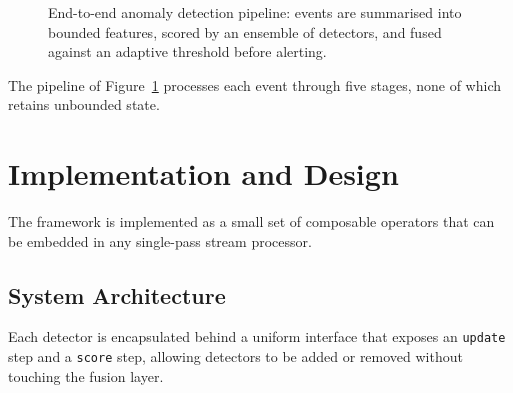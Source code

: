 \documentclass[12pt,a4paper,oneside]{report}
\begin{document}
\begin{figure}[ht]
  \centering
  \caption{End-to-end anomaly detection pipeline: events are summarised into
           bounded features, scored by an ensemble of detectors, and fused
           against an adaptive threshold before alerting.}
  \label{fig:pipeline}
\end{figure}

The pipeline of Figure~\ref{fig:pipeline} processes each event through five
stages, none of which retains unbounded state.

\chapter{Implementation and Design}
\label{ch:implementation}

The framework is implemented as a small set of composable operators that can
be embedded in any single-pass stream processor.

\section{System Architecture}
\label{sec:impl-arch}
Each detector is encapsulated behind a uniform interface that exposes an
\texttt{update} step and a \texttt{score} step, allowing detectors to be added
or removed without touching the fusion layer.
\end{document}

